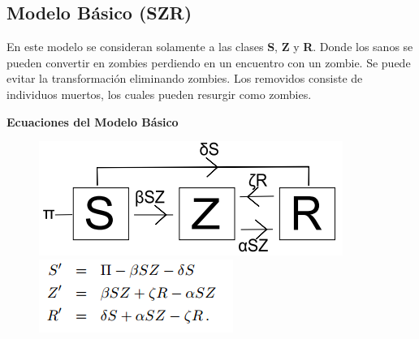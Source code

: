 \documentclass[12pt]{article}
\begin{document}
\subsection{Modelo Básico (SZR)}
En este modelo se consideran solamente a las clases \textbf{S}, \textbf{Z} y \textbf{R}. Donde los sanos se pueden convertir en zombies perdiendo en un encuentro con un zombie. Se puede evitar la transformación eliminando zombies. Los removidos consiste de individuos muertos, los cuales pueden resurgir como zombies.

\textbf{Ecuaciones del Modelo Básico}
\begin{figure}[H]
\centering
\includegraphics[scale=0.5]{ModeloG.png}
\hspace{0.5cm}
\includegraphics[scale=0.65]{Modelo.png}
\end{figure}
\end{document}
